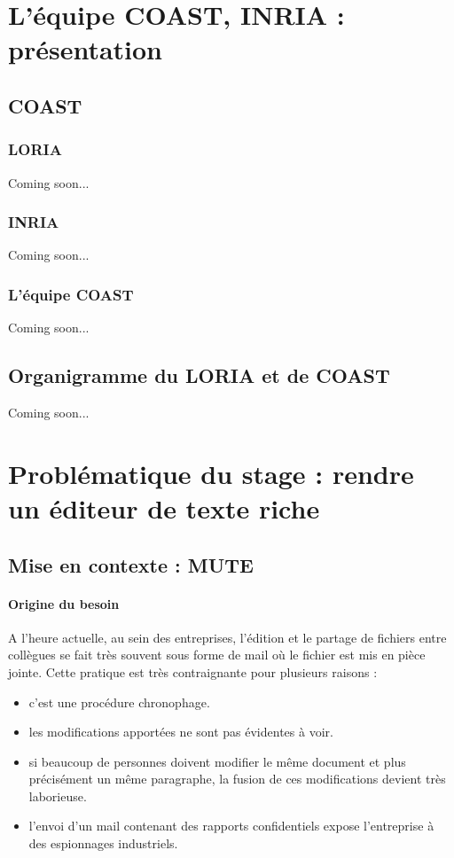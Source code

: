 \documentclass[12pt]{article}
\begin{document}
\newpage
\section{L'équipe COAST, INRIA : présentation}
\subsection{COAST}
\subsubsection{LORIA}
Coming soon...
\subsubsection{INRIA}
Coming soon...
\subsubsection{L'équipe COAST}
Coming soon...

\subsection{Organigramme du LORIA et de COAST}
Coming soon...

\newpage
\section{Problématique du stage : rendre un éditeur de texte riche}
\subsection{Mise en contexte : MUTE}
\paragraph{Origine du besoin}
A l'heure actuelle, au sein des entreprises, l'édition et le partage de fichiers entre collègues se fait très souvent sous forme de mail où le fichier est mis en pièce jointe. Cette pratique est très contraignante pour plusieurs raisons :\\
\begin{itemize}
    \item c'est une procédure chronophage.
    \item les modifications apportées ne sont pas évidentes à voir.
    \item si beaucoup de personnes doivent modifier le même document et plus précisément un même paragraphe, la fusion de ces modifications devient très laborieuse.
    \item l'envoi d'un mail contenant des rapports confidentiels expose l'entreprise à des espionnages industriels.
\end{itemize}
\end{document}
